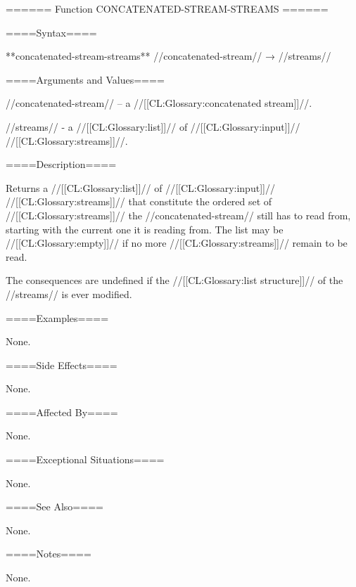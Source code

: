 ====== Function CONCATENATED-STREAM-STREAMS ======

====Syntax====

**concatenated-stream-streams** //concatenated-stream// → //streams//

====Arguments and Values====

//concatenated-stream// -- a //[[CL:Glossary:concatenated stream]]//.

//streams// - a //[[CL:Glossary:list]]// of //[[CL:Glossary:input]]// //[[CL:Glossary:streams]]//.

====Description====

Returns a //[[CL:Glossary:list]]// of //[[CL:Glossary:input]]// //[[CL:Glossary:streams]]// that constitute the ordered set of //[[CL:Glossary:streams]]// the //concatenated-stream// still has to read from, starting with the current one it is reading from. The list may be //[[CL:Glossary:empty]]// if no more //[[CL:Glossary:streams]]// remain to be read.

The consequences are undefined if the //[[CL:Glossary:list structure]]// of the //streams// is ever modified.

====Examples====

None.

====Side Effects====

None.

====Affected By====

None.

====Exceptional Situations====

None.

====See Also====

None.

====Notes====

None.

